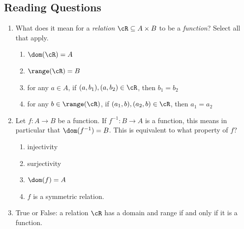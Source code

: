 

\subsection*{Reading Questions}

\begin{enumerate}
    \item What does it mean for a \emph{relation} $\cR\subseteq A\times B$ to be a \emph{function}? Select all that apply.
    \begin{enumerate}
        \item $\dom(\cR) = A$
        \item $\range(\cR) = B$
        \item for any $a \in A$, if $(a,b_1), (a,b_2) \in \cR$, then $b_1 = b_2$
        \item for any $b \in \range(\cR)$, if $(a_1,b), (a_2,b) \in \cR$, then $a_1 = a_2$
    \end{enumerate}
    
    \item Let $f : A \to B$ be a function. If $f^{-1} : B \to A$ is a function, this means in particular that $\dom(f^{-1}) = B$. This is equivalent to what property of $f$?
    \begin{enumerate}
        \item injectivity
        \item surjectivity
        \item $\dom(f) = A$
        \item $f$ is a symmetric relation.
    \end{enumerate}
    
    \item True or False: a relation $\cR$ has a domain and range if and only if it is a function.
\end{enumerate}

